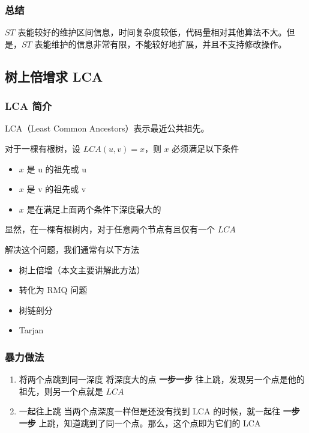 \subsubsection{总结}

$ST$ 表能较好的维护区间信息，时间复杂度较低，代码量相对其他算法不大。但是，$ST$ 表能维护的信息非常有限，不能较好地扩展，并且不支持修改操作。

\subsection{树上倍增求 LCA}

\subsubsection{LCA 简介}

LCA（Least Common Ancestors）表示最近公共祖先。

对于一棵有根树，设 $LCA(u,v)=x$，则 $x$ 必须满足以下条件

\begin{itemize}
\item $x$ 是 u 的祖先或 u
\item $x$ 是 v 的祖先或 v
\item $x$ 是在满足上面两个条件下深度最大的
\end{itemize}

显然，在一棵有根树内，对于任意两个节点有且仅有一个 $LCA$

解决这个问题，我们通常有以下方法

\begin{itemize}
\item 树上倍增（本文主要讲解此方法）
\item 转化为 RMQ 问题
\item 树链剖分
\item Tarjan
\end{itemize}

\subsubsection{暴力做法}

\begin{enumerate}
\item 将两个点跳到同一深度
将深度大的点 \textbf{ 一步一步 } 往上跳，发现另一个点是他的祖先，则另一个点就是 $LCA$
\item 一起往上跳
当两个点深度一样但是还没有找到 LCA 的时候，就一起往 \textbf{ 一步一步 } 上跳，知道跳到了同一个点。那么，这个点即为它们的 LCA
\end{enumerate}

